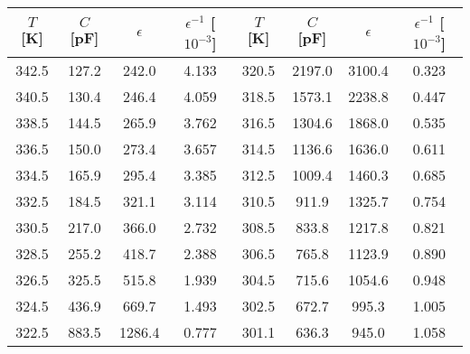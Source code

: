             \begin{tabular}{|c|c|c|c||c|c|c|c|}
                \hline
                $T$ [K] & $C$ [pF] & $\epsilon$ & $\epsilon^{-1}$ [$10^{-3}$] &
                $T$ [K] & $C$ [pF] & $\epsilon$ & $\epsilon^{-1}$ [$10^{-3}$] 
                \\ \hline
342.5 & 127.2 & 242.0 & 4.133 & 320.5 & 2197.0 & 3100.4 & 0.323\\
340.5 & 130.4 & 246.4 & 4.059 & 318.5 & 1573.1 & 2238.8 & 0.447\\
338.5 & 144.5 & 265.9 & 3.762 & 316.5 & 1304.6 & 1868.0 & 0.535\\
336.5 & 150.0 & 273.4 & 3.657 & 314.5 & 1136.6 & 1636.0 & 0.611\\
334.5 & 165.9 & 295.4 & 3.385 & 312.5 & 1009.4 & 1460.3 & 0.685\\
332.5 & 184.5 & 321.1 & 3.114 & 310.5 & 911.9 & 1325.7 & 0.754\\
330.5 & 217.0 & 366.0 & 2.732 & 308.5 & 833.8 & 1217.8 & 0.821\\
328.5 & 255.2 & 418.7 & 2.388 & 306.5 & 765.8 & 1123.9 & 0.890\\
326.5 & 325.5 & 515.8 & 1.939 & 304.5 & 715.6 & 1054.6 & 0.948\\
324.5 & 436.9 & 669.7 & 1.493 & 302.5 & 672.7 & 995.3 & 1.005\\
322.5 & 883.5 & 1286.4 & 0.777 & 301.1 & 636.3 & 945.0 & 1.058\\
                \hline
            \end{tabular}

